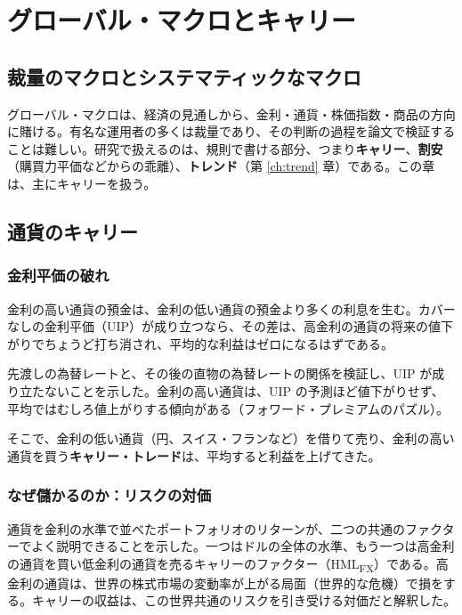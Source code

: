 \chapter{グローバル・マクロとキャリー}
\label{ch:macro}

\section{裁量のマクロとシステマティックなマクロ}

グローバル・マクロは、経済の見通しから、金利・通貨・株価指数・商品の方向に賭ける。有名な運用者の多くは裁量であり、その判断の過程を論文で検証することは難しい。研究で扱えるのは、規則で書ける部分、つまり\textbf{キャリー}、\textbf{割安}（購買力平価などからの乖離）、\textbf{トレンド}（第 \ref{ch:trend} 章）である。この章は、主にキャリーを扱う。

\section{通貨のキャリー}

\subsection{金利平価の破れ}

金利の高い通貨の預金は、金利の低い通貨の預金より多くの利息を生む。カバーなしの金利平価（UIP）が成り立つなら、その差は、高金利の通貨の将来の値下がりでちょうど打ち消され、平均的な利益はゼロになるはずである。

\begin{paperbox}
先渡しの為替レートと、その後の直物の為替レートの関係を検証し、UIP が成り立たないことを示した。金利の高い通貨は、UIP の予測ほど値下がりせず、平均ではむしろ値上がりする傾向がある（フォワード・プレミアムのパズル）。
\end{paperbox}

そこで、金利の低い通貨（円、スイス・フランなど）を借りて売り、金利の高い通貨を買う\textbf{キャリー・トレード}は、平均すると利益を上げてきた。

\subsection{なぜ儲かるのか：リスクの対価}

\begin{paperbox}
通貨を金利の水準で並べたポートフォリオのリターンが、二つの共通のファクターでよく説明できることを示した。一つはドルの全体の水準、もう一つは高金利の通貨を買い低金利の通貨を売るキャリーのファクター（HML\textsubscript{FX}）である。高金利の通貨は、世界の株式市場の変動率が上がる局面（世界的な危機）で損をする。キャリーの収益は、この世界共通のリスクを引き受ける対価だと解釈した。
\end{paperbox}

